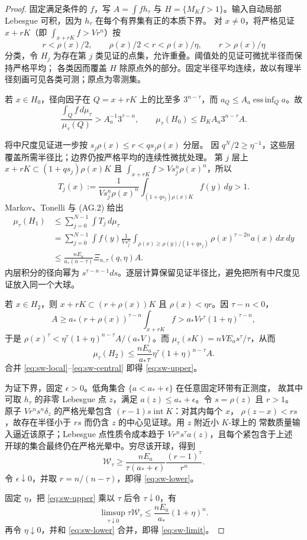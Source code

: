 \begin{proof}
固定满足条件的 $f$，写 $A=\int f h_\tau$ 与 $H=\{M_Kf>1\}$。输入自动局部 Lebesgue 可积，因为 $h_\tau$ 在每个有界集有正的本质下界。
对 $x\ne0$，将严格见证 $x+rK$（即 $\int_{x+rK}f>Vr^n$）按
\[
r<\rho(x)/2,\qquad \rho(x)/2<r<\rho(x)/\eta,\qquad r>\rho(x)/\eta \tag{SW.4}
\]
分类，令 $H_j$ 为存在第 $j$ 类见证的点集，允许重叠。阈值处的见证可微扰半径而保持严格平均；
各类因而覆盖 $H$ 除原点外的部分。固定半径平均连续，故以有理半径刻画可见各类可测；原点为零测集。

若 $x\in H_0$，径向因子在 $Q=x+rK$ 上的比至多 $3^{n-\tau}$，而
$a_Q\le A_a\operatorname*{ess\,inf}_Qa$。故
\[
\frac{\int_Qf\,d\mu_\tau}{\mu_\tau(Q)}>A_a^{-1}3^{\tau-n},
\qquad
\mu_\tau(H_0)\le B_K A_a3^{n-\tau}A. \tag{SW.5}\label{eq:sw-local}
\]

将中尺度见证进一步按 $s_j\rho(x)\le r<qs_j\rho(x)$ 分层。
因 $q^N/2\ge\eta^{-1}$，这些层覆盖所需半径比；边界仍按严格平均的连续性微扰处理。
第 $j$ 层上 $x+rK\subset(1+qs_j)\rho(x)K$ 且 $\int_{x+rK}f>Vs_j^n\rho(x)^n$，所以
\[
T_j(x):=\frac1{Vs_j^n\rho(x)^n}\int_{(1+qs_j)\rho(x)K}f(y)\,dy>1.
\]
Markov、Tonelli 与 (AG.2) 给出
\begin{align*}
\mu_\tau(H_1)
&\le\sum_{j=0}^{N-1}\int T_j\,d\mu_\tau\\
&=\sum_{j=0}^{N-1}\int f(y)\frac1{Vs_j^n}
\int_{\rho(x)\ge\rho(y)/(1+qs_j)}\rho(x)^{\tau-2n}a(x)\,dx\,dy\\
&\le\frac{nE_a}{a_*(n-\tau)}\Xi_{n,\tau}(q,\eta)A. \tag{SW.6}\label{eq:sw-middle}
\end{align*}
内层积分的径向幂为 $s^{\tau-n-1}ds$。逐层计算保留见证半径比，避免把所有中尺度见证放入同一个大球。

若 $x\in H_2$，则 $x+rK\subset(r+\rho(x))K$ 且 $\rho(x)<\eta r$。因 $\tau-n<0$，
\[
A\ge a_*(r+\rho(x))^{\tau-n}\int_{x+rK}f
>a_*Vr^\tau(1+\eta)^{\tau-n},
\]
于是 $\rho(x)^\tau<\eta^\tau(1+\eta)^{n-\tau}A/(a_*V)$。而
$\mu_\tau(sK)=nVE_as^\tau/\tau$，从而
\[\mu_\tau(H_2)\le\frac{nE_a}{a_*\tau}\eta^\tau(1+\eta)^{n-\tau}A.\tag{SW.7}\label{eq:sw-central}\]
合并 \eqref{eq:sw-local}--\eqref{eq:sw-central} 即得 \eqref{eq:sw-upper}。

为证下界，固定 $\epsilon>0$。低角集合 $\{a<a_*+\epsilon\}$ 在任意固定环带有正测度，
故其中可取 $h_\tau$ 的非零 Lebesgue 点 $z$，满足 $a(z)\le a_*+\epsilon$。令 $s=\rho(z)$ 且 $r>1$。
原子 $Vr^ns^n\delta_z$ 的严格光晕包含 $(r-1)s\operatorname{int}K$：对其内每个 $x$，
$\rho(z-x)<rs$，故存在半径小于 $rs$ 而仍含 $z$ 的中心见证球。用 $z$ 附近小 $K$-球上的
常数质量输入逼近该原子；Lebesgue 点性质令成本趋于 $Vr^ns^\tau a(z)$，且每个紧包含于上述
开球的集合最终仍在严格光晕中。穷尽该开球，得到
\[
\mathcal W_\tau\ge\frac{nE_a}{\tau(a_*+\epsilon)}\frac{(r-1)^\tau}{r^n}.
\]
令 $\epsilon\downarrow0$，并取 $r=n/(n-\tau)$，即得 \eqref{eq:sw-lower}。

固定 $\eta$，把 \eqref{eq:sw-upper} 乘以 $\tau$ 后令 $\tau\downarrow0$，有
\[\limsup_{\tau\downarrow0}\tau \mathcal W_\tau\le\frac{nE_a}{a_*}(1+\eta)^n.\]
再令 $\eta\downarrow0$，并和 \eqref{eq:sw-lower} 合并，即得 \eqref{eq:sw-limit}。
\end{proof}

